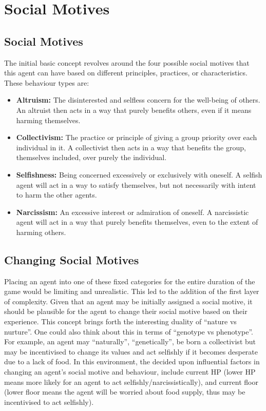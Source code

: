 \section{Social Motives}\label{social_motives}
\subsection{Social Motives}
The initial basic concept revolves around the four possible social motives that this agent can have based on different principles, practices, or characteristics. These behaviour types are: 

\begin{itemize}
    \item \textbf{Altruism:} The disinterested and selfless concern for the well-being of others. An altruist then acts in a way that purely benefits others, even if it means harming themselves.
    \item \textbf{Collectivism:} The practice or principle of giving a group priority over each individual in it. A collectivist then acts in a way that benefits the group, themselves included, over purely the individual.
    \item \textbf{Selfishness:} Being concerned excessively or exclusively with oneself. A selfish agent will act in a way to satisfy themselves, but not necessarily with intent to harm the other agents.
    \item \textbf{Narcissism:} An excessive interest or admiration of oneself. A narcissistic agent will act in a way that purely benefits themselves, even to the extent of harming others.
\end{itemize}


\subsection{Changing Social Motives}
Placing an agent into one of these fixed categories for the entire duration of the game would be limiting and unrealistic. This led to the addition of the first layer of complexity. Given that an agent may be initially assigned a social motive, it should be plausible for the agent to change their social motive based on their experience. This concept brings forth the interesting duality of ``nature vs nurture''. One could also think about this in terms of “genotype vs phenotype”. For example, an agent may “naturally”, “genetically”, be born a collectivist but may be incentivised to change its values and act selfishly if it becomes desperate due to a lack of food. In this environment, the decided upon influential factors in changing an agent’s social motive and behaviour, include current HP (lower HP means more likely for an agent to act selfishly/narcissistically), and current floor (lower floor means the agent will be worried about food supply, thus may be incentivised to act selfishly).

